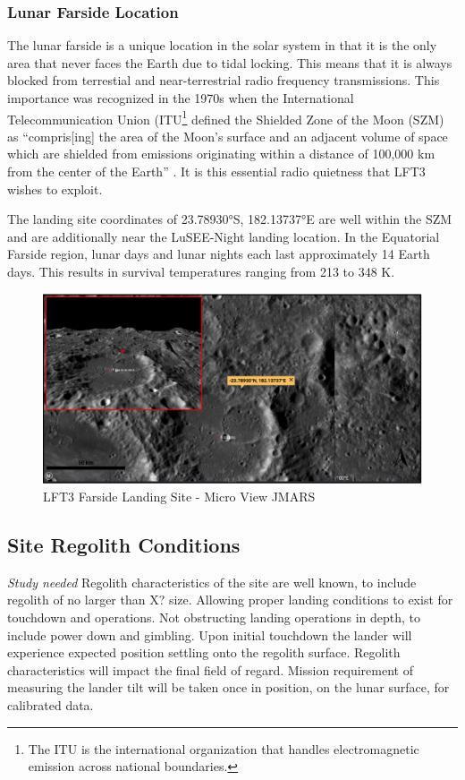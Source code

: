 \subsubsection{Lunar Farside Location}
The lunar farside is a unique location in the solar system in that it is the only area that never faces the Earth due to tidal locking.  This means that it is always blocked from terrestial and near-terrestrial radio frequency transmissions.  This importance was recognized in the 1970s when the International Telecommunication Union (ITU\footnote{The ITU is the international organization that handles electromagnetic emission across national boundaries.} defined the Shielded Zone of the Moon (SZM) as “compris[ing] the area of the Moon’s surface and an adjacent volume of space which are shielded from emissions originating within a distance of 100,000 km from the center of the Earth” \citep{itu_rr_2024}.  It is this essential radio quietness that LFT3 wishes to exploit.

The landing site coordinates of 23.78930°S, 182.13737°E are well within the SZM and are additionally near the LuSEE-Night landing location.  In the Equatorial Farside region, lunar days and lunar nights each last approximately 14 Earth days. This results in survival temperatures ranging from 213 to 348 K.

    
\begin{figure}
	\centering
	\includegraphics[width=\linewidth]{figures/Landing site overview.PNG}
	\caption{LFT3 Farside Landing Site - Micro View JMARS}
\end{figure}


\subsection{Site Regolith Conditions}
\textit{Study needed}
Regolith characteristics of the site are well known, to include regolith of no larger than X? size. Allowing proper landing conditions to exist for touchdown and operations. Not obstructing landing operations in depth, to include power down and gimbling. Upon initial touchdown the lander will experience expected position settling onto the regolith surface. Regolith characteristics will impact the final field of regard. Mission requirement of measuring the lander tilt will be taken once in position, on the lunar surface, for calibrated data.